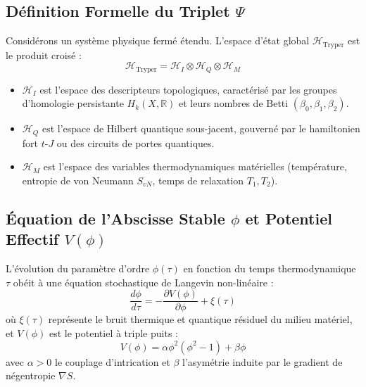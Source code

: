\documentclass[12pt,a4paper]{article}
\begin{document}
\subsection{Définition Formelle du Triplet $\Psi$}

Considérons un système physique fermé étendu. L'espace d'état global $\mathcal{H}_{\text{Tryper}}$ est le produit croisé :
\begin{equation}
\mathcal{H}_{\text{Tryper}} = \mathcal{H}_I \otimes \mathcal{H}_Q \otimes \mathcal{H}_M
\end{equation}
\begin{itemize}
    \item $\mathcal{H}_I$ est l'espace des descripteurs topologiques, caractérisé par les groupes d'homologie persistante $H_k(X, \mathbb{R})$ et leurs nombres de Betti $(\beta_0, \beta_1, \beta_2)$.
    \item $\mathcal{H}_Q$ est l'espace de Hilbert quantique sous-jacent, gouverné par le hamiltonien fort $t$-$J$ ou des circuits de portes quantiques.
    \item $\mathcal{H}_M$ est l'espace des variables thermodynamiques matérielles (température, entropie de von Neumann $S_{vN}$, temps de relaxation $T_1, T_2$).
\end{itemize}

\subsection{Équation de l'Abscisse Stable $\phi$ et Potentiel Effectif $V(\phi)$}

L'évolution du paramètre d'ordre $\phi(\tau)$ en fonction du temps thermodynamique $\tau$ obéit à une équation stochastique de Langevin non-linéaire :
\begin{equation}
\frac{d\phi}{d\tau} = -\frac{\partial V(\phi)}{\partial \phi} + \xi(\tau)
\end{equation}
où $\xi(\tau)$ représente le bruit thermique et quantique résiduel du milieu matériel, et $V(\phi)$ est le potentiel à triple puits :
\begin{equation}
V(\phi) = \alpha \phi^2 (\phi^2 - 1) + \beta \phi
\end{equation}
avec $\alpha > 0$ le couplage d'intrication et $\beta$ l'asymétrie induite par le gradient de négentropie $\nabla S$.
\end{document}
